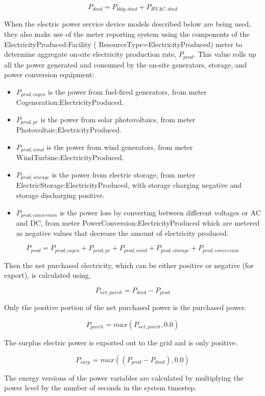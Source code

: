 \begin{equation}
  P_{dmd} = P_{bldg,dmd} + P_{HVAC,dmd}
\end{equation}

When the electric power service device models described below are being used, they also make use of the meter reporting system using the components of the ElectricityProduced:Facility ( ResourceType=ElectricityProduced) meter to determine aggregate on-site electricity production rate, $P_{prod}$.  This value rolls up all the power generated and consumed by the on-site generators, storage, and power conversion equipment:

\begin{itemize}
  \item $P_{prod,cogen}$ is the power from fuel-fired generators, from meter Cogeneration:ElectricityProduced.
  \item $P_{prod,pv}$ is the power from solar photovoltaics, from meter Photovoltaic:ElectricityProduced.
  \item $P_{prod,wind}$ is the power from wind generators, from meter WindTurbine:ElectricityProduced.
  \item $P_{prod,storage}$ is the power from electric storage, from meter ElectricStorage:ElectricityProduced, with storage charging negative and storage discharging positive.
  \item $P_{prod,conversion}$ is the power loss by converting between different voltages or AC and DC, from meter PowerConversion:ElectricityProduced which are metered as negative values that decrease the amount of electricity produced.
\end{itemize}

\begin{equation}
  {P_{prod}}= {P_{prod,cogen}} + {P_{prod,pv}} + {P_{prod,wind}} + {P_{prod,storage}} + {P_{prod,conversion}}
\end{equation}

Then the net purchased electricity, which can be either positive or negative (for export), is calculated using,

\begin{equation}
  {P_{net,purch}} = {P_{dmd}} - {P_{prod}}
\end{equation}

Only the positive portion of the net purchased power is the purchased power.

\begin{equation}
  {P_{purch}} = { max ( {P_{net,purch}}, 0.0 ) }
\end{equation}

The surplus electric power is exported out to the grid and is only positive. 

\begin{equation}
  {P_{surp}} =  { max ( ({P_{prod}} - {P_{dmd}}) , 0.0 ) }
\end{equation}

The energy versions of the power variables are calculated by multiplying the power level by the number of seconds in the system timestep. 